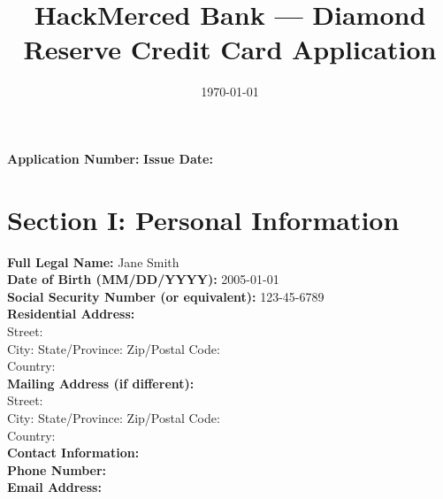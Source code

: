 \documentclass[12pt,a4paper]{article}
\begin{document}
\title{\textbf{HackMerced Bank --- Diamond Reserve Credit Card Application}}
\author{}
\date{\today}
\maketitle

\thispagestyle{empty}

\begin{center}
\textbf{Application Number:} \underline{\hspace{2in}} \hspace{1cm}
\textbf{Issue Date:} \underline{\hspace{1.5in}}
\end{center}

\vspace{1cm}

\section*{Section I: Personal Information}
\noindent\textbf{Full Legal Name:} Jane Smith\\[1ex]
\textbf{Date of Birth (MM/DD/YYYY):} 2005-01-01\\[1ex]
\textbf{Social Security Number (or equivalent):} 123-45-6789\\[1ex]
\textbf{Residential Address:}\\
\quad Street: \\[1ex]
\quad City:  \quad State/Province:  \quad Zip/Postal Code: \\[1ex]
\quad Country: \\[2ex]
\textbf{Mailing Address (if different):}\\
\quad Street: \\[1ex]
\quad City:  \quad State/Province:  \quad Zip/Postal Code: \\[1ex]
\quad Country: \\[2ex]
\textbf{Contact Information:}\\[1ex]
\quad \textbf{Phone Number:} \\[1ex]
\quad \textbf{Email Address:} \\[2ex]
\end{document}
